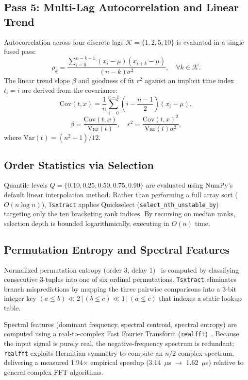 \documentclass[conference]{IEEEtran}
\newcommand{\tsxtract}{\texttt{Tsxtract}}
\begin{document}
\subsection{Pass 5: Multi-Lag Autocorrelation and Linear Trend}
Autocorrelation across four discrete lags $\mathcal{K} = \{1, 2, 5, 10\}$ is evaluated in a single fused pass:
\begin{equation}
\label{eq:autocorr}
\rho_k = \frac{\sum_{i=0}^{n-k-1} (x_i - \mu)(x_{i+k} - \mu)}{(n - k) \sigma^2}, \quad \forall k \in \mathcal{K}.
\end{equation}
The linear trend slope $\beta$ and goodness of fit $r^2$ against an implicit time index $t_i = i$ are derived from the covariance:
\begin{equation}
\label{eq:trend_cov}
\text{Cov}(t, x) = \frac{1}{n} \sum_{i=0}^{n-1} \left(i - \frac{n-1}{2}\right)(x_i - \mu),
\end{equation}
\begin{equation}
\label{eq:trend_slope_r2}
\beta = \frac{\text{Cov}(t, x)}{\text{Var}(t)}, \quad r^2 = \frac{\text{Cov}(t, x)^2}{\text{Var}(t) \sigma^2},
\end{equation}
where $\text{Var}(t) = (n^2 - 1) / 12$.

\subsection{Order Statistics via Selection}
Quantile levels $Q = \{0.10, 0.25, 0.50, 0.75, 0.90\}$ are evaluated using NumPy's default linear interpolation method. Rather than performing a full array sort ($O(n \log n)$), \tsxtract{} applies Quickselect (\texttt{select\_nth\_unstable\_by})~\cite{hoare1961algorithm} targeting only the ten bracketing rank indices. By recursing on median ranks, selection depth is bounded logarithmically, executing in $O(n)$ time.

\subsection{Permutation Entropy and Spectral Features}
Normalized permutation entropy (order 3, delay 1)~\cite{bandt2002permutation} is computed by classifying consecutive 3-tuples into one of six ordinal permutations. \tsxtract{} eliminates branch mispredictions by mapping the three pairwise comparisons into a 3-bit integer key $(a \le b) \ll 2 \,|\, (b \le c) \ll 1 \,|\, (a \le c)$ that indexes a static lookup table.

Spectral features (dominant frequency, spectral centroid, spectral entropy) are computed using a real-to-complex Fast Fourier Transform (\texttt{realfft})~\cite{frigo2005design}. Because the input signal is purely real, the negative-frequency spectrum is redundant; \texttt{realfft} exploits Hermitian symmetry to compute an $n/2$ complex spectrum, delivering a measured 1.94$\times$ empirical speedup (3.14~$\mu$s $\to$ 1.62~$\mu$s) relative to general complex FFT algorithms.
\end{document}
